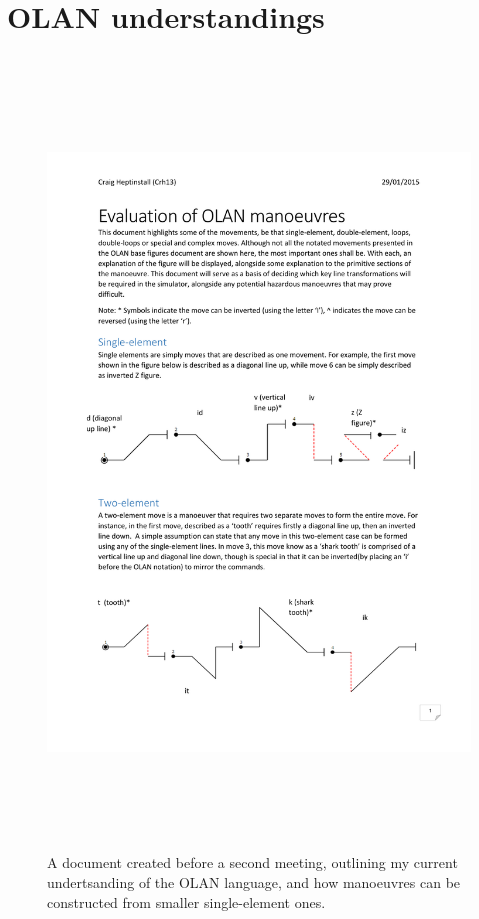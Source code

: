 \section{OLAN understandings}
\label{app:olan}
\begin{figure}[h!]
	\centering
	\caption{A document created before a second meeting, outlining my current undertsanding of the OLAN language, and how manoeuvres can be constructed from smaller single-element ones.}
	\includegraphics[width=16cm,height=21cm,page=1]{images/eval.pdf}
\end{figure}
